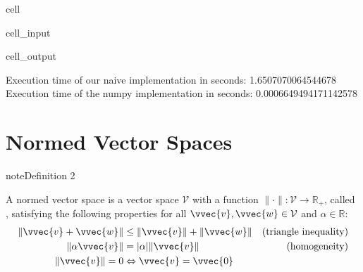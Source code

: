 \documentclass[letterpaper,10pt,english]{jupyterBook}
\begin{document}
\begin{sphinxuseclass}{cell}
\begin{sphinxVerbatimInput}
\begin{sphinxuseclass}{cell_input}
\end{sphinxuseclass}\end{sphinxVerbatimInput}
\begin{sphinxVerbatimOutput}

\begin{sphinxuseclass}{cell_output}
\begin{sphinxVerbatim}[commandchars=\\\{\}]
Execution time of our naive implementation in seconds: 1.6507070064544678
Execution time of the numpy implementation in seconds: 0.0006649494171142578
\end{sphinxVerbatim}

\end{sphinxuseclass}\end{sphinxVerbatimOutput}

\end{sphinxuseclass}
\sphinxstepscope


\section{Normed Vector Spaces}
\label{\detokenize{linalg_normed_vs:normed-vector-spaces}}\label{\detokenize{linalg_normed_vs::doc}}\label{linalg_normed_vs:definition-0}
\begin{sphinxadmonition}{note}{Definition 2}



\sphinxAtStartPar
A normed vector space is a vector space \(\mathcal{V}\) with a
function \(\lVert\cdot\rVert:\mathcal{V}\rightarrow \mathbb{R}_+\), called , satisfying the following properties for all \(\vvec{v},\vvec{w}\in\mathcal{V}\) and \(\alpha\in\mathbb{R}\):
\begin{align*}
    \lVert \vvec{v}+\vvec{w}\rVert &\leq\lVert\vvec{v}\rVert +\lVert\vvec{w}\rVert &\text{(triangle inequality)}\\
    \lVert \alpha\vvec{v}\rVert &=\lvert\alpha\rvert\lVert\vvec{v}\rVert &\text{(homogeneity)}\\
    \lVert\vvec{v}\rVert =0&\Leftrightarrow \vvec{v}=\vvec{0}
\end{align*}\end{sphinxadmonition}
\end{document}
